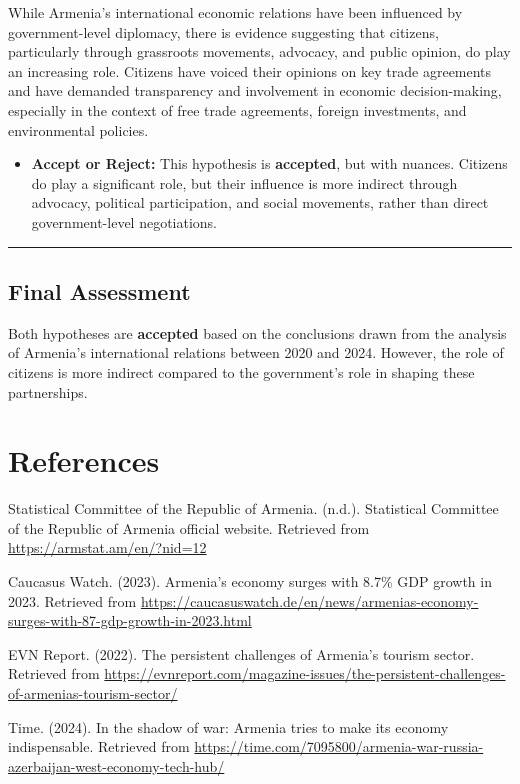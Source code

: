 \documentclass[
]{article}
\providecommand{\tightlist}{%
  \setlength{\itemsep}{0pt}\setlength{\parskip}{0pt}}
\begin{document}
While Armenia's international economic relations have been influenced by
government-level diplomacy, there is evidence suggesting that citizens,
particularly through grassroots movements, advocacy, and public opinion,
do play an increasing role. Citizens have voiced their opinions on key
trade agreements and have demanded transparency and involvement in
economic decision-making, especially in the context of free trade
agreements, foreign investments, and environmental policies.

\begin{itemize}
\tightlist
\item
  \textbf{Accept or Reject:} This hypothesis is \textbf{accepted}, but
  with nuances. Citizens do play a significant role, but their influence
  is more indirect through advocacy, political participation, and social
  movements, rather than direct government-level negotiations.
\end{itemize}

\begin{center}\rule{0.5\linewidth}{0.5pt}\end{center}

\subsection{Final Assessment}\label{final-assessment}

Both hypotheses are \textbf{accepted} based on the conclusions drawn
from the analysis of Armenia's international relations between 2020 and
2024. However, the role of citizens is more indirect compared to the
government's role in shaping these partnerships.

\section{References}\label{references}

Statistical Committee of the Republic of Armenia. (n.d.). Statistical
Committee of the Republic of Armenia official website. Retrieved from
\url{https://armstat.am/en/?nid=12}

Caucasus Watch. (2023). Armenia's economy surges with 8.7\% GDP growth
in 2023. Retrieved from
\url{https://caucasuswatch.de/en/news/armenias-economy-surges-with-87-gdp-growth-in-2023.html}

EVN Report. (2022). The persistent challenges of Armenia's tourism
sector. Retrieved from
\url{https://evnreport.com/magazine-issues/the-persistent-challenges-of-armenias-tourism-sector/}

Time. (2024). In the shadow of war: Armenia tries to make its economy
indispensable. Retrieved from
\url{https://time.com/7095800/armenia-war-russia-azerbaijan-west-economy-tech-hub/}
\end{document}
